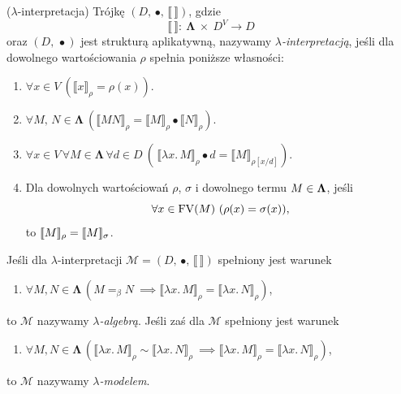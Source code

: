 \begin{definicja}\label{def:lambda-model-1}(\(\lambda\)-interpretacja) %
  Trójkę \((D,\,\bullet,\,\llbracket\,\rrbracket)\), gdzie 
   \[\llbracket\,\rrbracket:\:\mathbf{\Lambda}\ \times\ D^{V}\to D\]
  oraz \((D,\,\bullet)\) jest strukturą aplikatywną,
  nazywamy \emph{\(\lambda\)-interpretacją}, jeśli dla dowolnego wartościowania \(\rho\) spełnia poniższe własności:
  \begin{enumerate}[label={(\roman*)}, ref={(\roman*)}]
    \setlength\itemsep{0em}
    \item \(\forall x \in V\ \left(\llbracket x \rrbracket_\rho = \rho(x)\right)\).\label{def:lambda-interpret-1}
    \item \(\forall M,\,N \in \mathbf{\Lambda}\ (\llbracket MN \rrbracket_\rho = \llbracket M\rrbracket_\rho \bullet \llbracket N \rrbracket_\rho)\).\label{def:lambda-interpret-2}
    \item \(\forall x \in V\,\forall M\in \mathbf{\Lambda}\,\forall d\in D\ (\, \llbracket \lambda x.\,M\rrbracket_\rho \bullet d = \llbracket M \rrbracket_{\rho[x/d]})\).\label{def:lambda-interpret-3}
    \item Dla dowolnych wartościowań \(\rho\),  \(\sigma\) i dowolnego termu \(M\in\nobreak\mathbf{\Lambda}\), jeśli \[\forall x\in\nobreak\mathrm{FV}(M)\ (\rho(x) =\nobreak \sigma(x)),\] to \(\llbracket M\rrbracket_\rho =\nobreak\llbracket M \rrbracket_\sigma\).\label{def:lambda-interpret-4}
  \end{enumerate}

  Jeśli dla \(\lambda\)-interpretacji \(\mathcal{M}=(D,\,\bullet,\,\llbracket\,\rrbracket)\) spełniony jest warunek
  \begin{enumerate}[label={(\roman*)}, ref={(\roman*)}]
    \setlength\itemsep{0em}
    \item \(\forall M,N\in\mathbf{\Lambda}\,\left(M=_\beta N\ \implies \llbracket \lambda x.\,M\rrbracket_\rho = \llbracket \lambda x.\,N\rrbracket_\rho\right)\),\label{def:lambda-interpret-5}

   \end{enumerate}
  to \(\mathcal{M}\) nazywamy \emph{\(\lambda\)-algebrą}. Jeśli zaś dla \(\mathcal{M}\) spełniony jest warunek
   \begin{enumerate}[label={(\roman*)}, ref={(\roman*)}]
    \setlength\itemsep{0em}
    \item \(\forall M,N\in\mathbf{\Lambda}\,\left(\llbracket\lambda x.\,M\rrbracket_\rho \sim \llbracket \lambda x.\,N\rrbracket_\rho\ \implies \llbracket \lambda x.\,M\rrbracket_\rho = \llbracket \lambda x.\,N\rrbracket_\rho\right)\),\label{def:lambda-interpret-6}
   \end{enumerate}        
  to \(\mathcal{M}\) nazywamy \emph{\(\lambda\)-modelem}. 


\end{definicja}
